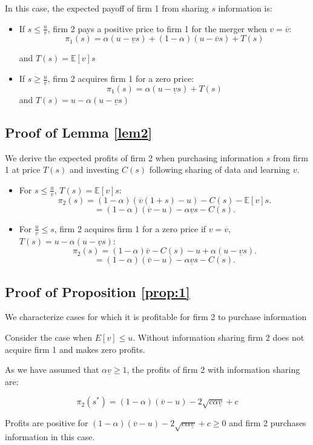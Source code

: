 \documentclass[a4paper,leqno]{article}%
\newcommand{\E}{\mathbb E}
\renewcommand{\a}{\alpha}
\newcommand{\uv}{\underline{v}}
\newcommand{\ov}{\overline{v}}
\begin{document}
In this case, the expected payoff of firm 1 from sharing $s$ information is:

\begin{itemize}
    \item If $s\leq \frac{u}{\ov}$, firm 2 pays a positive price to firm 1 for the merger when $v=\ov$:
    $$\pi_1(s)=\a(u-\uv s)+(1-\a)(u-\ov s)+T(s)$$
    
    and $T(s)=\E[v]s$
    \item If $s\geq \frac{u}{\ov}$, firm 2 acquires firm 1 for a zero price:
    $$\pi_1(s)=\a(u-\uv s)+T(s)$$
    and $T(s)=u-\a(u-\uv s)$
\end{itemize}


\subsection{Proof of Lemma \ref{lem2}}\label{lem2p}

We derive the expected profits of firm 2 when purchasing information $s$ from firm 1 at price $T(s)$ and investing $C(s)$ following sharing of data and learning $v$.

\begin{itemize}
    \item For $s\leq \frac{u}{\ov}$, $T(s)=\E[v]s$:
        $$\pi_2(s)=(1-\a)(\ov(1+s)-u)-C(s)-\E[v]s.$$
        $$=(1-\a)(\ov -u)-\a \uv s-C(s).$$

    \item For $\frac{u}{\ov}\leq s$, firm 2 acquires firm 1 for a zero price if $v=\ov$, $T(s)=u-\a(u-\uv s)$:
        $$\pi_2(s)=(1-\a)\ov-C(s)-u+\a(u-\uv s).$$
        $$=(1-\a)(\ov -u)-\a \uv s-C(s).$$
\end{itemize}

\subsection{Proof of Proposition \ref{prop:1}}\label{prop:1p}

We characterize cases for which it is profitable for firm 2 to purchase information

Consider the case when $E[v]\leq u$. Without information sharing firm 2 does not acquire firm 1 and makes zero profits.

As we have assumed that $\a\uv\geq1$, the profits of firm 2 with information sharing are:

$$\pi_2(s^*)=(1-\a)(\ov -u)-2 \sqrt{c\a \uv}+c$$

Profits are positive for $(1-\a)(\ov -u)-2 \sqrt{c\a \uv}+c\geq0$ and firm 2 purchases information in this case. 
\end{document}
